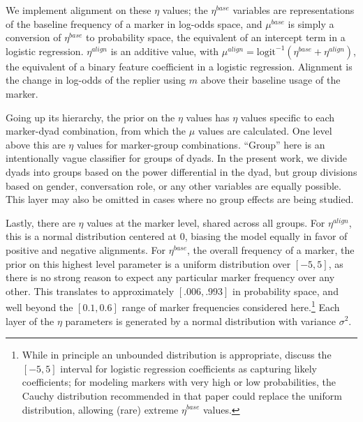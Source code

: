 \documentclass{acm_proc_article-sp}
\begin{document}
We implement alignment on these $\eta$ values; the $\eta^{base}$ variables are representations of the baseline frequency of a marker in log-odds space, and $\mu^{base}$ is simply a conversion of $\eta^{base}$ to probability space, the equivalent of an intercept term in a logistic regression. $\eta^{align}$ is an additive value, with $\mu^{align} = \textrm{logit}^{-1}(\eta^{base}+\eta^{align})$, the equivalent of a binary feature coefficient in a logistic regression.  Alignment is the change in log-odds of the replier using $m$ above their baseline usage of the marker. %

Going up its hierarchy, the prior on the $\eta$ values has $\eta$ values specific to each marker-dyad combination, from which the $\mu$ values are calculated. One level above this are $\eta$ values for marker-group combinations. ``Group'' here is an intentionally vague classifier for groups of dyads.  In the present work, we divide dyads into groups based on the power differential in the dyad, but group divisions based on gender, conversation role, or any other variables are equally possible. This layer may also be omitted in cases where no group effects are being studied.

Lastly, there are $\eta$ values at the marker level, shared across all groups.  For $\eta^{align}$, this is a normal distribution centered at 0, biasing the model equally in favor of positive and negative alignments. For $\eta^{base}$, the overall frequency of a marker, the prior on this highest level parameter is a uniform distribution over $[-5,5]$, as there is no strong reason to expect any particular marker frequency over any other.  This translates to approximately $[.006,.993]$ in probability space, and well beyond the $[0.1,0.6]$ range of marker frequencies considered here.\footnote{While in principle an unbounded distribution is appropriate, \cite{GelmanEtAl2008} discuss the $[-5,5]$ interval for logistic regression coefficients as capturing likely coefficients; for modeling markers with very high or low probabilities, the Cauchy distribution recommended in that paper could replace the uniform distribution, allowing (rare) extreme $\eta^{base}$ values.}  Each layer of the $\eta$ parameters is generated by a normal distribution with variance $\sigma^2$.

\end{document}
